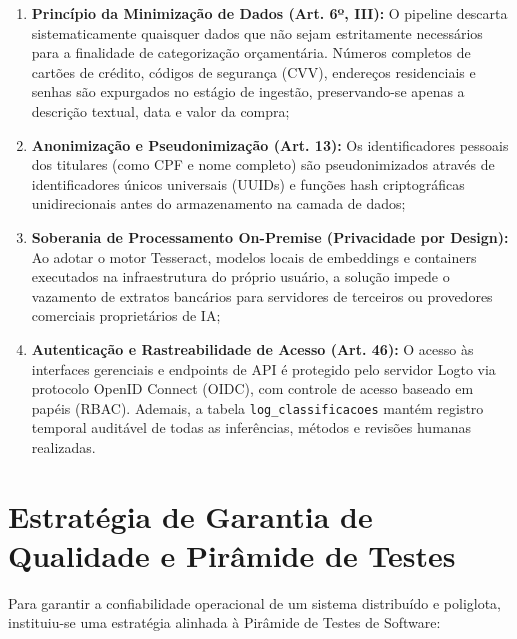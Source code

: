 \documentclass[
	12pt,				
	openright,			
	oneside,			
	a4paper,			
	english,			
	brazil				
	]{abntex2}
\begin{document}
\begin{enumerate}
    \item \textbf{Princípio da Minimização de Dados (Art. 6º, III):} O pipeline descarta sistematicamente quaisquer dados que não sejam estritamente necessários para a finalidade de categorização orçamentária. Números completos de cartões de crédito, códigos de segurança (CVV), endereços residenciais e senhas são expurgados no estágio de ingestão, preservando-se apenas a descrição textual, data e valor da compra;
    \item \textbf{Anonimização e Pseudonimização (Art. 13):} Os identificadores pessoais dos titulares (como CPF e nome completo) são pseudonimizados através de identificadores únicos universais (UUIDs) e funções hash criptográficas unidirecionais antes do armazenamento na camada de dados;
    \item \textbf{Soberania de Processamento On-Premise (Privacidade por Design):} Ao adotar o motor Tesseract, modelos locais de embeddings e containers executados na infraestrutura do próprio usuário, a solução impede o vazamento de extratos bancários para servidores de terceiros ou provedores comerciais proprietários de IA;
    \item \textbf{Autenticação e Rastreabilidade de Acesso (Art. 46):} O acesso às interfaces gerenciais e endpoints de API é protegido pelo servidor Logto via protocolo OpenID Connect (OIDC), com controle de acesso baseado em papéis (RBAC). Ademais, a tabela \texttt{log\_classificacoes} mantém registro temporal auditável de todas as inferências, métodos e revisões humanas realizadas.
\end{enumerate}

\section{Estratégia de Garantia de Qualidade e Pirâmide de Testes}
\label{sec:sol_testes}

Para garantir a confiabilidade operacional de um sistema distribuído e poliglota, instituiu-se uma estratégia alinhada à Pirâmide de Testes de Software:
\end{document}
